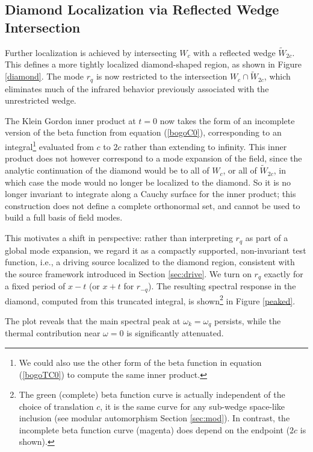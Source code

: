 \documentclass[12pt,a4paper]{article}
\begin{document}
\subsection{Diamond Localization via Reflected Wedge Intersection}

Further localization is achieved by intersecting $W_c$ with a reflected wedge $\widetilde{W}_{2c}$. This defines a more tightly localized diamond-shaped region, as shown in Figure \ref{diamond}. The mode $r_q$ is now restricted to the intersection $W_c \cap \widetilde{W}_{2c}$, which eliminates much of the infrared behavior previously associated with the unrestricted wedge.

The Klein Gordon inner product at $t=0$ now takes the form of an incomplete version of the beta function from equation (\ref{bogoC0}), corresponding to an integral\footnote{We could also use the other form of the beta function in equation (\ref{bogoTC0}) to compute the same inner product.} evaluated from $c$ to $2c$ rather than extending to infinity. This inner product does not however correspond to a mode expansion of the field, since the analytic continuation of the diamond would be to all of $W_c$, or all of $\widetilde{W}_{2c}$, in which case the mode would no longer be localized to the diamond.  So it is no longer invariant to integrate along a Cauchy surface for the inner product; this construction does not define a complete orthonormal set, and cannot be used to build a full basis of field modes.

This motivates a shift in perspective: rather than interpreting $r_q$ as part of a global mode expansion, we regard it as a compactly supported, non-invariant test function, i.e., a driving source localized to the diamond region, consistent with the source framework introduced in Section \ref{sec:drive}. We turn on $r_q$ exactly for a fixed period of $x-t$ (or $x+t$ for $r_{-q}$). The resulting spectral response in the diamond, computed from this truncated integral, is shown\footnote{The green (complete) beta function curve is actually independent of the choice of translation $c$, it is the same curve for any sub-wedge space-like inclusion (see modular automorphism Section \ref{sec:mod}). In contrast, the incomplete beta function curve (magenta) does depend on the endpoint ($2c$ is shown).} in Figure \ref{peaked}.


The plot reveals that the main spectral peak at $\omega_k = \omega_q$ persists, while the thermal contribution near $\omega = 0$ is significantly attenuated.
\end{document}
